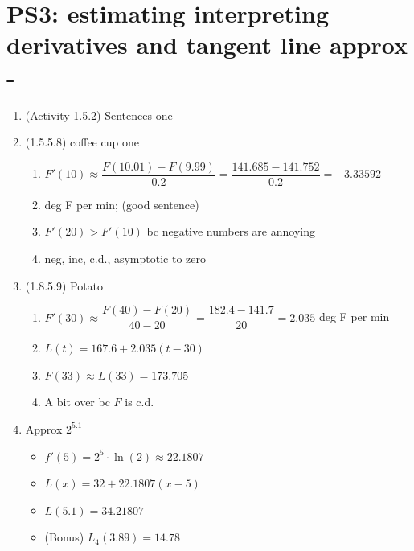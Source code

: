 


%


\allowdisplaybreaks
\section{PS3: estimating interpreting derivatives and tangent line approx  -  }


\everymath{\displaystyle}
\begin{enumerate}[leftmargin=0pt]

\item (Activity 1.5.2) Sentences one
\item (1.5.5.8) coffee cup one
\begin{enumerate}
    \item $F'(10) \approx \dfrac{F(10.01)-F(9.99)}{0.2} 
    = \dfrac{141.685 - 141.752}{0.2}= -3.33592$
    \item deg F per min; (good sentence)
    \item $F'(20) > F'(10)$ bc negative numbers are annoying
    \item neg, inc, c.d., asymptotic to zero
\end{enumerate}

\item (1.8.5.9) Potato
\begin{enumerate}
    \item $F'(30) \approx \dfrac{F(40)-F(20)}{40-20} 
    = \dfrac{182.4-141.7}{20} = 2.035$ deg F per min
    \item $L(t)= 167.6 + 2.035(t-30)$
    \item $F(33) \approx L(33) = 173.705$
    \item A bit over bc $F$ is c.d.
\end{enumerate}

\item Approx $2^{5.1}$
\begin{itemize}
    \item $f'(5) = 2^5 \cdot \ln(2) \approx 22.1807$
    \item $L(x)=32 + 22.1807(x-5)$
    \item $L(5.1) = 34.21807$
    \item (Bonus) $L_4(3.89) = 14.78$
\end{itemize}

\end{enumerate}


